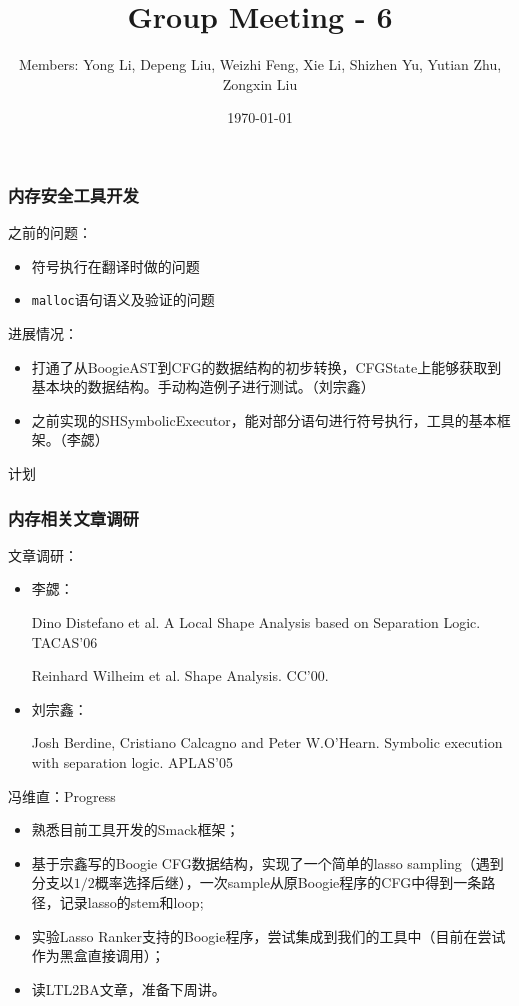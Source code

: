 \documentclass[aspectratio=1610, 13pt]{beamer}
\title{Group Meeting - 6}
\date{\today}
\author{Members: Yong Li, Depeng Liu, Weizhi Feng, Xie Li, Shizhen Yu, Yutian Zhu, Zongxin Liu}
\begin{document}
\maketitle
\begin{frame}\frametitle{内存安全工具开发}
之前的问题：
\begin{itemize}
\item 符号执行在翻译时做的问题
\item \texttt{malloc}语句语义及验证的问题

\end{itemize}

进展情况：
\begin{itemize}
\item 打通了从BoogieAST到CFG的数据结构的初步转换，CFGState上能够获取到基本块的数据结构。手动构造例子进行测试。（刘宗鑫）
\item 之前实现的SHSymbolicExecutor，能对部分语句进行符号执行，工具的基本框架。（李勰）

\end{itemize}


计划

\end{frame}

\begin{frame}\frametitle{内存相关文章调研}
文章调研：
\begin{itemize}
\item 李勰：

Dino Distefano et al. A Local Shape Analysis based on Separation Logic. TACAS’06 


Reinhard Wilheim et al. Shape Analysis. CC'00.

\item 刘宗鑫：

Josh Berdine, Cristiano Calcagno and Peter W.O’Hearn. Symbolic execution with separation logic. APLAS'05

\end{itemize}
\end{frame}

\begin{frame}{冯维直：Progress}
    \begin{itemize}
        \item 熟悉目前工具开发的Smack框架；
        \item 基于宗鑫写的Boogie CFG数据结构，实现了一个简单的lasso sampling（遇到分支以$1/2$概率选择后继），一次sample从原Boogie程序的CFG中得到一条路径，记录lasso的stem和loop;
          \item 实验Lasso
        Ranker支持的Boogie程序，尝试集成到我们的工具中（目前在尝试作为黑盒直接调用）；
        \item 读LTL2BA文章，准备下周讲。
\end{itemize}    
\end{frame}
\end{document}
